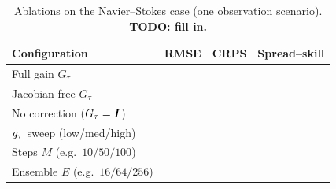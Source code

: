 \begin{table}[ht]
    \centering
    \small
    \caption{Ablations on the Navier--Stokes case (one observation scenario). \textbf{TODO: fill in.}}
    \label{tab:ablation}
    \begin{tabular}{l|ccc}
        \toprule
        Configuration & RMSE & CRPS & Spread--skill \\
        \midrule
        Full gain $G_\tau$              & & & \\
        Jacobian-free $G_\tau$          & & & \\
        No correction ($G_\tau=\bm{I}$)    & & & \\
        \midrule
        $g_\tau$ sweep (low/med/high) & & & \\
        Steps $M$ (e.g.\ $10/50/100$)      & & & \\
        Ensemble $E$ (e.g.\ $16/64/256$)   & & & \\
        \bottomrule
    \end{tabular}
\end{table}
